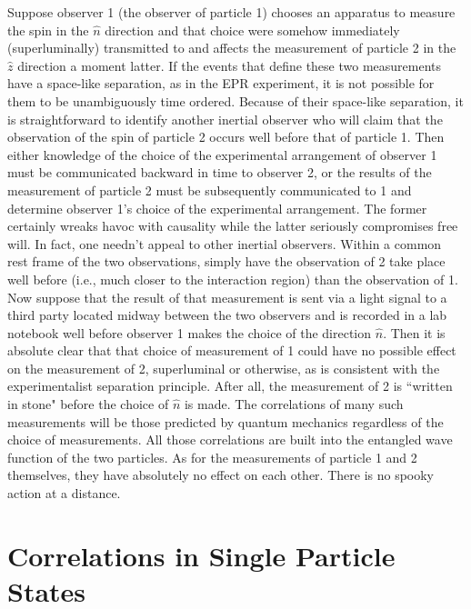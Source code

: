 \documentclass[12pt]{article}
\begin{document}
Suppose observer 1 (the observer of particle 1) chooses an apparatus to measure the spin in the $\hat{n}$ direction and that choice were somehow immediately (superluminally) transmitted to and affects the measurement of particle 2 in the $\hat{z}$ direction a moment latter. If the events that define these two measurements have a space-like separation, as in the EPR experiment, it is not possible for them to be unambiguously time ordered. Because of their space-like separation, it is straightforward to identify another inertial observer who will claim that the observation of the spin of particle 2 occurs well before that of particle 1. Then either knowledge of the choice of the experimental arrangement of observer 1 must be communicated backward in time to observer 2, or the results of the measurement of particle 2 must be subsequently communicated to 1 and determine observer 1's choice of the experimental arrangement. The former certainly wreaks havoc with causality while the latter seriously compromises free will. In fact, one needn't appeal to other inertial observers. Within a common rest frame of the two observations, simply have the observation of 2 take place well before (i.e., much closer to the interaction region) than the observation of 1. Now suppose that the result of that measurement is sent via a light signal to a third party located midway between the two observers and is recorded in a lab notebook well before observer 1 makes the choice of the direction $\hat{n}$. Then it is absolute clear that that choice of measurement of 1 could have no possible effect on the measurement of 2, superluminal or otherwise, as is consistent with the experimentalist separation principle. After all, the measurement of 2 is ``written in stone" before the choice of $\hat{n}$ is made. The correlations of many such measurements will be those predicted by quantum mechanics regardless of the choice of measurements. All those correlations are built into the entangled wave function of the two particles. As for the measurements of particle 1 and 2 themselves, they have absolutely no effect on each other. There is no spooky action at a distance.

\section{Correlations in Single Particle States}\label{prob}
\end{document}
